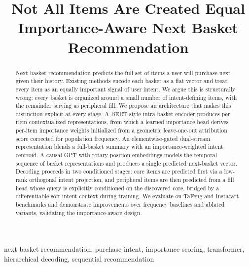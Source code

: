\documentclass[conference]{IEEEtran}
\begin{document}
\title{Not All Items Are Created Equal\\
\vspace{0.5cm}
\large Importance-Aware Next Basket Recommendation}

\author{
\and
{}
\and
{}
\and
{}
}

\maketitle

\begin{abstract}
Next basket recommendation predicts the full set of items a user will
purchase next given their history. Existing methods encode each basket
as a flat vector and treat every item as an equally important signal of
user intent. We argue this is structurally wrong: every basket is
organized around a small number of intent-defining items, with the
remainder serving as peripheral fill. We propose an architecture that
makes this distinction explicit at every stage. A BERT-style intra-basket
encoder produces per-item contextualized representations, from which a
learned importance head derives per-item importance weights initialized
from a geometric leave-one-out attribution score corrected for
population frequency. An elementwise-gated dual-stream representation
blends a full-basket summary with an importance-weighted intent centroid.
A causal GPT with rotary position embeddings models the temporal sequence
of basket representations and produces a single predicted next-basket
vector. Decoding proceeds in two conditioned stages: core items are
predicted first via a low-rank orthogonal intent projection, and
peripheral items are then predicted from a fill head whose query is
explicitly conditioned on the discovered core, bridged by a
differentiable soft intent context during training.
We evaluate on TaFeng and Instacart benchmarks and demonstrate
improvements over frequency baselines and ablated variants,
validating the importance-aware design.
\end{abstract}

\begin{IEEEkeywords}
next basket recommendation, purchase intent, importance scoring,
transformer, hierarchical decoding, sequential recommendation
\end{IEEEkeywords}
\end{document}
